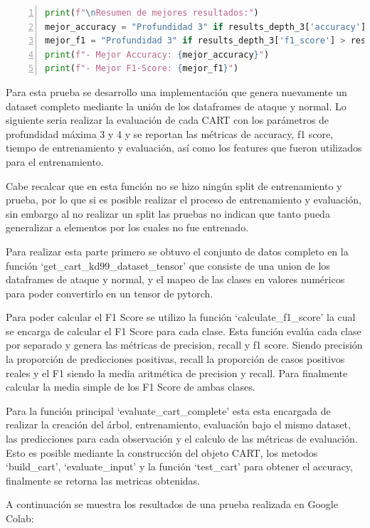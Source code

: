 \documentclass[12pt,a4paper]{article}
\begin{document}
\begin{lstlisting}[language=Python, numbers=left, basicstyle=\ttfamily\tiny,label={lst:lstlisting9}]
print(f"\nResumen de mejores resultados:")
mejor_accuracy = "Profundidad 3" if results_depth_3['accuracy'] > results_depth_4['accuracy'] else "Profundidad 4"
mejor_f1 = "Profundidad 3" if results_depth_3['f1_score'] > results_depth_4['f1_score'] else "Profundidad 4"
print(f"- Mejor Accuracy: {mejor_accuracy}")
print(f"- Mejor F1-Score: {mejor_f1}")
\end{lstlisting}

Para esta prueba se desarrollo una implementación que genera nuevamente un dataset completo mediante la unión
de los dataframes de ataque y normal.
Lo siguiente seria realizar la evaluación de cada CART con los parámetros de profundidad máxima
3 y 4 y se reportan las métricas de accuracy, f1 score, tiempo de entrenamiento y evaluación, así como los features que
fueron utilizados para el entrenamiento.

Cabe recalcar que en esta función no se hizo ningún split de entrenamiento y prueba, por lo que si es posible realizar el proceso
de entrenamiento y evaluación, sin embargo al no realizar un split las pruebas no indican que tanto pueda generalizar a elementos
por los cuales no fue entrenado.

Para realizar esta parte primero se obtuvo el conjunto de datos completo en la función `get_cart_kd99_dataset_tensor'
que consiste de una union de los dataframes de ataque y normal, y
el mapeo de las clases en valores numéricos para poder convertirlo en un tensor de pytorch.

Para poder calcular el F1 Score se utilizo la función `calculate_f1_score' la cual se encarga de calcular
el F1 Score para cada clase.
Esta función evalúa cada clase por separado y genera las métricas de precision, recall y f1 score.
Siendo precisión la proporción de predicciones positivas, recall la proporción de casos positivos reales y el F1 siendo la media aritmética de precision y recall.
Para finalmente calcular la media simple de los F1 Score de ambas clases.

Para la función principal `evaluate_cart_complete' esta esta encargada de realizar la creación del árbol, entrenamiento, evaluación
bajo el mismo dataset, las predicciones para cada observación y el calculo de las métricas de evaluación. Esto es posible mediante
la construcción del objeto CART, los metodos `build_cart', `evaluate_input' y la función `test_cart' para obtener el accuracy, finalmente
se retorna las metricas obtenidas.

A continuación se muestra los resultados de una prueba realizada en Google Colab:
\end{document}
